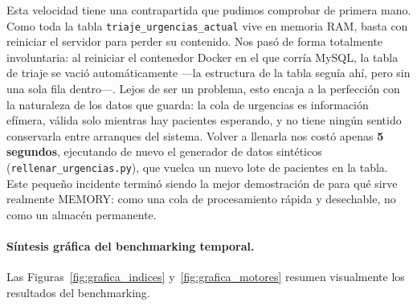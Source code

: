 \documentclass[../main.tex]{subfiles}
\begin{document}
Esta velocidad tiene una contrapartida que pudimos comprobar de primera mano. Como toda la tabla \texttt{triaje\_urgencias\_actual} vive en memoria RAM, basta con reiniciar el servidor para perder su contenido. Nos pasó de forma totalmente involuntaria: al reiniciar el contenedor Docker en el que corría MySQL, la tabla de triaje se vació automáticamente —la estructura de la tabla seguía ahí, pero sin una sola fila dentro—. Lejos de ser un problema, esto encaja a la perfección con la naturaleza de los datos que guarda: la cola de urgencias es información efímera, válida solo mientras hay pacientes esperando, y no tiene ningún sentido conservarla entre arranques del sistema. Volver a llenarla nos costó apenas \textbf{5 segundos}, ejecutando de nuevo el generador de datos sintéticos (\texttt{rellenar\_urgencias.py}), que vuelca un nuevo lote de pacientes en la tabla. Este pequeño incidente terminó siendo la mejor demostración de para qué sirve realmente MEMORY: como una cola de procesamiento rápida y desechable, no como un almacén permanente.

\paragraph{Síntesis gráfica del benchmarking temporal.}

Las Figuras~\ref{fig:grafica_indices} y~\ref{fig:grafica_motores} resumen visualmente los resultados del benchmarking.
\end{document}
